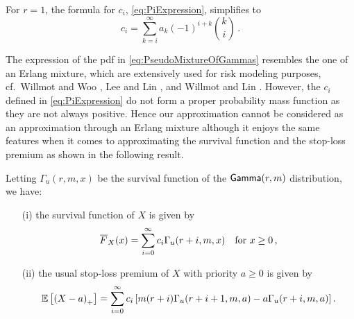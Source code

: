 \begin{remark}
For $r=1$, the formula for $c_i$, \eqref{eq:PiExpression}, simplifies to
\[ c_i = \sum_{k=i}^\infty a_k (-1)^{i+k} \binom{k}{i} \,. \]
\remQED
\end{remark}

The expression of the pdf in \eqref{eq:PseudoMixtureOfGammas} resembles the one of an Erlang mixture, which are extensively used for risk modeling purposes, cf.\ Willmot and Woo \cite{WiWo07}, Lee and Lin \cite{LeLi10}, and Willmot and Lin \cite{WiLi11}. However, the $c_i$ defined in \eqref{eq:PiExpression} do not form a proper probability mass function as they are not always positive. Hence our approximation cannot be considered as an approximation through an Erlang mixture although it enjoys the same features when it comes to approximating the survival function and the stop-loss premium as shown in the following result.
\begin{proposition} \label{prop:OrthogonalPolynomialForm}
Letting $\Gamma_u(r,m,x)$ be the survival function of the $\mathsf{Gamma}(r,m)$ distribution,  we have:
\begin{itemize}
\item[(i)] the survival function of $X$ is given by
\begin{equation}\label{eq:TailFunctionX}
\Ftail_{X}(x) = \sum_{i=0}^{\infty}c_i\Gamma_{u}(r+i,m,x) \quad \text{for } x \ge 0 \,,
\end{equation}
\item[(ii)] the usual stop-loss premium of $X$ with priority $a \ge 0$ is given by
\begin{equation}
\operatorname{{\mathbb E}}\left[\left(X-a\right)_{+}\right] = \sum_{i=0}^{\infty}c_i\left[m (r+i) \Gamma_{u}(r+i+1,m,a)-a\Gamma_{u}(r+i,m,a)\right]. \label{eq:UsualStoplossX}
\end{equation}
\end{itemize}
\end{proposition}
